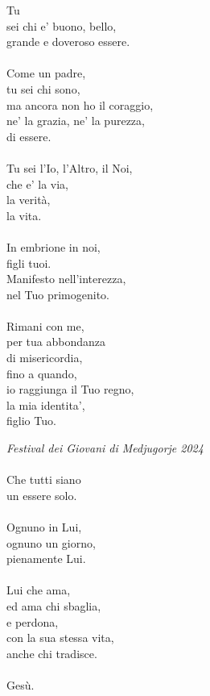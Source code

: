 \begin{haiku}
    Tu\\
    sei chi e' buono, bello,\\
    grande e doveroso essere.\\
    \leavevmode\\
    Come un padre,\\
    tu sei chi sono,\\
    ma ancora non ho il coraggio,\\
    ne' la grazia, ne' la purezza,\\
    di essere.\\
    \leavevmode\\
    Tu sei l'Io, l'Altro, il Noi,\\
    che e' la via,\\
    la verità,\\ 
    la vita.\\
    \leavevmode\\
    In embrione in noi, \\
    figli tuoi.\\
    Manifesto nell'interezza,\\
    nel Tuo primogenito.\\
    \leavevmode\\
    Rimani con me,\\
    per tua abbondanza \\
    di misericordia,\\
    fino a quando,\\
    io raggiunga il Tuo regno,\\
    la mia identita',\\
    figlio Tuo.\\
\end{haiku}


\begin{haiku}
\emph{Festival dei Giovani di Medjugorje 2024}\\
\leavevmode\\
Che tutti siano\\
un essere solo.\\
\leavevmode\\
Ognuno in Lui,\\
ognuno un giorno,\\
pienamente Lui.\\
\leavevmode\\
Lui che ama,\\
ed ama chi sbaglia,\\
e perdona,\\
con la sua stessa vita,\\
anche chi tradisce.\\
\leavevmode\\
Gesù.\\
\end{haiku}

